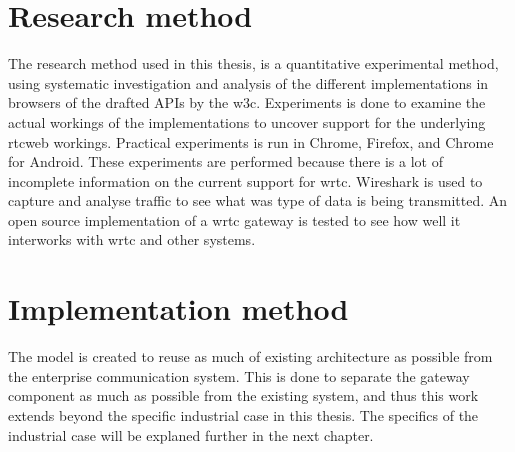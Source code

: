 \section{Research method}
The research method used in this thesis, is a quantitative experimental method, using systematic investigation and analysis of the different implementations in browsers of the drafted APIs by the \gls{w3c}. Experiments is done to examine the actual workings of the implementations to uncover support for the underlying \gls{rtcweb} workings. Practical experiments is run in Chrome, Firefox, and Chrome for Android. These experiments are performed because there is a lot of incomplete information on the current support for \gls{wrtc}. Wireshark is used to capture and analyse traffic to see what was type of data is being transmitted. An open source implementation of a \gls{wrtc} gateway is tested to see how well it interworks with \gls{wrtc} and other systems. 

\section{Implementation method}
The model is created to reuse as much of existing architecture as possible from the enterprise communication system. This is done to separate the gateway component as much as possible from the existing system, and thus this work extends beyond the specific industrial case in this thesis. The specifics of the industrial case will be explaned further in the next chapter.





